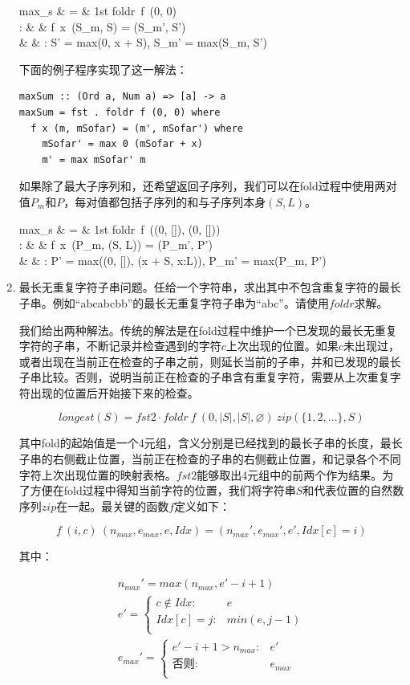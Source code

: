 \documentclass[UTF8]{article}
\begin{document}
\begin{enumerate}
\blre
max_s & = & 1st \cdot foldr\ f\ (0, 0) \\
: & & f\ x\ (S_m, S) = (S_m', S') \\
& & :  S' = max(0, x + S), S_m' = max(S_m, S') \\
\elre

下面的例子程序实现了这一解法：

\lstset{frame=single}
\begin{lstlisting}
maxSum :: (Ord a, Num a) => [a] -> a
maxSum = fst . foldr f (0, 0) where
  f x (m, mSofar) = (m', mSofar') where
    mSofar' = max 0 (mSofar + x)
    m' = max mSofar' m
\end{lstlisting}

如果除了最大子序列和，还希望返回子序列，我们可以在fold过程中使用两对值$P_m$和$P$，每对值都包括子序列的和与子序列本身$(S, L)$。

\blre
max_s & = & 1st \cdot foldr\ f\ ((0, []), (0, [])) \\
: & & f\ x\ (P_m, (S, L)) = (P_m', P') \\
& & :  P' = max((0, []), (x + S, x:L)), P_m' = max(P_m, P') \\
\elre

\item 最长无重复字符子串问题。任给一个字符串，求出其中不包含重复字符的最长子串。例如``abcabcbb''的最长无重复字符子串为``abc''。请使用$foldr$求解。

我们给出两种解法。传统的解法是在fold过程中维护一个已发现的最长无重复字符的子串，不断记录并检查遇到的字符$c$上次出现的位置。如果$c$未出现过，或者出现在当前正在检查的子串之前，则延长当前的子串，并和已发现的最长子串比较。否则，说明当前正在检查的子串含有重复字符，需要从上次重复字符出现的位置后开始接下来的检查。

\[
longest(S) = fst2 \cdot foldr\ f\ (0, |S|, |S|, \varnothing)\ zip(\{1, 2, ...\}, S)
\]

其中fold的起始值是一个4元组，含义分别是已经找到的最长子串的长度，最长子串的右侧截止位置，当前正在检查的子串的右侧截止位置，和记录各个不同字符上次出现位置的映射表格。$fst2$能够取出4元组中的前两个作为结果。为了方便在fold过程中得知当前字符的位置，我们将字符串$S$和代表位置的自然数序列$zip$在一起。最关键的函数$f$定义如下：

\[
f\ (i, c)\ (n_{max}, e_{max}, e, Idx) = (n_{max}', e_{max}', e', Idx[c] = i)
\]

其中：

\[ \begin{array}{l}
n_{max}' = max(n_{max}, e' - i + 1) \\
e' = \begin{cases}
  c \notin Idx: & e \\
  Idx[c] = j: & min(e, j - 1) \\
  \end{cases} \\
e_{max}' = \begin{cases}
  e' - i + 1 > n_{max}: & e' \\
  \text{否则}: & e_{max} \\
  \end{cases} \\
\end{array} \]


\end{enumerate}
\end{document}
